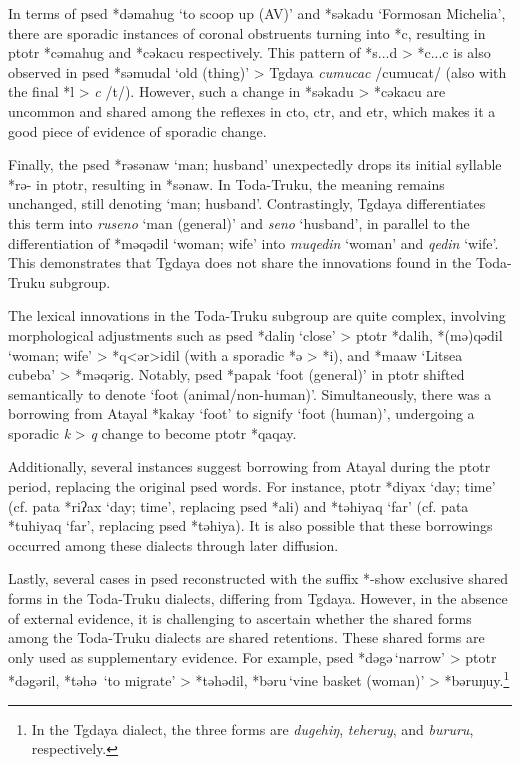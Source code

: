 In terms of \acl{psed} *dəmahug `to scoop up (AV)' and *səkadu `Formosan Michelia', there are sporadic instances of coronal obstruents turning into *c, resulting in \acl{ptotr} *cəmahug and *cəkacu respectively. This pattern of *s...d > *c...c is also observed in \acl{psed} *səmudal `old (thing)' > Tgdaya \textit{cumucac} /cumucat/ (also with the final *l > \textit{c} /t/). However, such a change in *səkadu > *cəkacu are uncommon and shared among the reflexes in \acl{cto}, \acl{ctr}, and \acl{etr}, which makes it a good piece of evidence of sporadic change.

Finally, the \acl{psed} *rəsənaw `man; husband' unexpectedly drops its initial syllable *rə- in \acl{ptotr}, resulting in *sənaw. In Toda-Truku, the meaning remains unchanged, still denoting `man; husband'. Contrastingly, Tgdaya differentiates this term into \textit{ruseno} `man (general)' and \textit{seno} `husband', in parallel to the differentiation of *məqədil `woman; wife' into \textit{muqedin} `woman' and \textit{qedin} `wife'. This demonstrates that Tgdaya does not share the innovations found in the Toda-Truku subgroup.

The lexical innovations in the Toda-Truku subgroup are quite complex, involving morphological adjustments such as \acl{psed} *daliŋ `close' > \acl{ptotr} *dalih, *(mə)qədil `woman; wife' > *q<ər>idil (with a sporadic *ə > *i), and *maaw `Litsea cubeba' > *məqərig. Notably, \acl{psed} *papak `foot (general)' in \acl{ptotr} shifted semantically to denote `foot (animal/non-human)'. Simultaneously, there was a borrowing from Atayal *kakay `foot' to signify `foot (human)', undergoing a sporadic \textit{k} > \textit{q} change to become \acl{ptotr} *qaqay.

Additionally, several instances suggest borrowing from Atayal during the \acl{ptotr} period, replacing the original \acl{psed} words. For instance, \ac{ptotr} *diyax `day; time' (cf. \ac{pata} *riʔax `day; time', replacing \ac{psed} *ali) and *təhiyaq `far' (cf. \ac{pata} *tuhiyaq `far', replacing \ac{psed} *təhiya). It is also possible that these borrowings occurred among these dialects through later diffusion.

Lastly, several cases in \acl{psed} reconstructed with the suffix *-\cvc show exclusive shared forms in the Toda-Truku dialects, differing from Tgdaya. However, in the absence of external evidence, it is challenging to ascertain whether the shared forms among the Toda-Truku dialects are shared retentions. These shared forms are only used as supplementary evidence. For example, \acl{psed} *dəgə\cvc\,`narrow' > \acl{ptotr} *dəgəril, *təhə\cvc\, `to migrate' > *təhədil, *bəru\cvc\,`vine basket (woman)' > *bəruŋuy.\footnote{In the Tgdaya dialect, the three forms are \textit{dugehiŋ}, \textit{teheruy}, and \textit{bururu}, respectively.}

